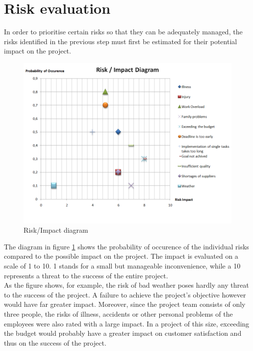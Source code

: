 \section{Risk evaluation}
In order to prioritise certain risks so that they can be adequately managed, the risks identified in the previous step must first be estimated for their potential impact on the project.
\begin{figure}[H]
	\centering
	\includegraphics[width =1.1\textwidth]{images/risk-impact2.PNG}
	\caption{Risk/Impact diagram}
	\label{risk-impact}
\end{figure}
The diagram in figure \ref{risk-impact} shows the probability of occurence of the individual risks compared to the possible impact on the project. The impact is evaluated on a scale of 1 to 10. 1 stands for a small but manageable inconvenience, while a 10 represents a threat to the success of the entire project.
\\
As the figure shows, for example, the risk of bad weather poses hardly any threat to the success of the project. A failure to achieve the project's objective however would have far greater impact. Moreover, since the project team consists of only three people, the risks of illness, accidents or other personal problems of the employees were also rated with a large impact. In a project of this size, exceeding the budget would probably have a greater impact on customer satisfaction and thus on the success of the project.

